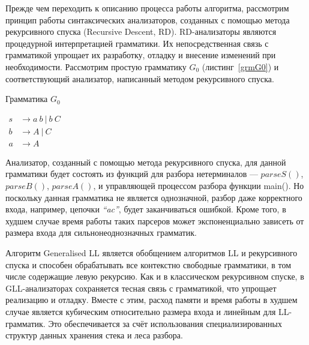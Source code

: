 Прежде чем переходить к описанию процесса работы алгоритма, рассмотрим принцип работы синтаксических анализаторов, созданных с помощью метода рекурсивного спуска (Recursive Descent, RD). RD-анализаторы являются процедурной интерпретацией грамматики. Их непосредственная связь с грамматикой упрощает их разработку, отладку и внесение изменений при необходимости. Рассмотрим простую грамматику $G_0$ (листинг~\ref{grmG0}) и соответствующий анализатор, написанный методом рекурсивного спуска.

\begin{listing}
\caption{Грамматика $G_0$}
\label{grmG0}
\centering
$\begin{array}{rl}
s & \rightarrow a \ b \ | \ b \ C \\
b & \rightarrow A \ | \ C \\
a & \rightarrow A 
\end{array}$
\end{listing}

Анализатор, созданный с помощью метода рекурсивного спуска, для данной грамматики будет состоять из функций для разбора нетерминалов --- $parseS()$, $parseB()$, $parseA()$, и управляющей процессом разбора функции main(). Но поскольку данная грамматика не является однозначной, разбор даже корректного входа, например, цепочки {\it ``ac''}, будет заканчиваться ошибкой. Кроме того, в худшем случае время работы таких парсеров может экспоненциально зависеть от размера входа для сильнонеоднозначных грамматик. 

Алгоритм Generalised LL является обобщением алгоритмов LL и рекурсивного спуска и способен обрабатывать все контекстно свободные грамматики, в том числе содержащие левую рекурсию. Как и в классическом рекурсивном спуске, в GLL-анализаторах сохраняется тесная связь с грамматикой, что упрощает  реализацию и отладку. Вместе с этим, расход памяти и время работы в худшем случае является кубическим относительно размера входа и линейным для LL-грамматик. Это обеспечивается за счёт использования специализированных структур данных хранения стека и леса разбора.

